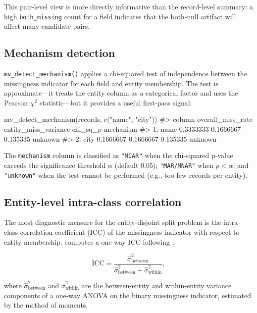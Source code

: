 \documentclass[a4paper]{article}
\begin{document}
\begin{article}
This pair-level view is more directly informative than the record-level
summary: a high \texttt{both\_missing} count for a field indicates that
the both-null artifact will affect many candidate pairs.

\subsection{Mechanism detection}

\texttt{mv\_detect\_mechanism()} applies a chi-squared test of
independence between the missingness indicator for each field and entity
membership. The test is approximate---it treats the entity column as a
categorical factor and uses the Pearson $\chi^2$ statistic---but it
provides a useful first-pass signal:

\begin{example}
mv_detect_mechanism(records, c("name", "city"))
#>    column overall_miss_rate entity_miss_variance chi_sq_p mechanism
#> 1:   name         0.3333333            0.1666667 0.135335   unknown
#> 2:   city         0.1666667            0.1666667 0.135335   unknown
\end{example}

The \texttt{mechanism} column is classified as \texttt{"MCAR"} when the
chi-squared p-value exceeds the significance threshold $\alpha$ (default
$0.05$); \texttt{"MAR/MNAR"} when $p < \alpha$; and \texttt{"unknown"}
when the test cannot be performed (e.g., too few records per entity).

\subsection{Entity-level intra-class correlation}

The most diagnostic measure for the entity-disjoint split problem is the
intra-class correlation coefficient (ICC) of the missingness indicator
with respect to entity membership.  computes a one-way ICC
following \citet{ShroutFleiss1979}:

\begin{equation}
\mathrm{ICC} = \frac{\hat{\sigma}^2_{\text{between}}}
               {\hat{\sigma}^2_{\text{between}} + \hat{\sigma}^2_{\text{within}}},
\label{eq:icc}
\end{equation}

where $\hat{\sigma}^2_{\text{between}}$ and
$\hat{\sigma}^2_{\text{within}}$ are the between-entity and
within-entity variance components of a one-way ANOVA on the binary
missingness indicator, estimated by the method of moments.


\end{article}
\end{document}
